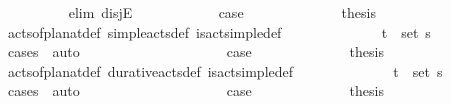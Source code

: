 \begin{isabellebody}
\ \ \ \ \ \ \ \ \isamarkupfalse%
\ {\isacharparenleft}{\kern0pt}elim\ disjE{\isacharparenright}{\kern0pt}\isanewline
\ \ \ \ \ \ \ \ \ \ \isamarkupfalse%
\ {\isacharquery}{\kern0pt}case{}\isanewline
\ \ \ \ \ \ \ \ \ \ \isamarkupfalse%
\ \isamarkupfalse%
\ {\isacharquery}{\kern0pt}thesis\isanewline
\ \ \ \ \ \ \ \ \ \ \ \ \isamarkupfalse%
\ acts{\isacharunderscore}{\kern0pt}of{\isacharunderscore}{\kern0pt}plan{\isacharunderscore}{\kern0pt}at{\isacharunderscore}{\kern0pt}def\ simple{\isacharunderscore}{\kern0pt}acts{\isacharunderscore}{\kern0pt}def\ is{\isacharunderscore}{\kern0pt}act{\isacharunderscore}{\kern0pt}simple{\isacharunderscore}{\kern0pt}def\isanewline
\ \ \ \ \ \ \ \ \ \ \ \ \isamarkupfalse%
\ {\isacartoucheopen}{\isacharparenleft}{\kern0pt}t\isactrlsub {\isasympi}{\isacharcomma}{\kern0pt}{\isasympi}{\isacharparenright}{\kern0pt}\ {\isasymin}\ set\ {\isasympi}s{\isacartoucheclose}\ \isamarkupfalse%
\ {\isacharparenleft}{\kern0pt}cases\ {\isasympi}{\isacharparenright}{\kern0pt}\ auto\isanewline
\ \ \ \ \ \ \ \ \isamarkupfalse%
\isanewline
\ \ \ \ \ \ \ \ \ \ \isamarkupfalse%
\ {\isacharquery}{\kern0pt}case{}\isanewline
\ \ \ \ \ \ \ \ \ \ \isamarkupfalse%
\ \isamarkupfalse%
\ {\isacharquery}{\kern0pt}thesis\isanewline
\ \ \ \ \ \ \ \ \ \ \ \ \isamarkupfalse%
\ acts{\isacharunderscore}{\kern0pt}of{\isacharunderscore}{\kern0pt}plan{\isacharunderscore}{\kern0pt}at{\isacharunderscore}{\kern0pt}def\ durative{\isacharunderscore}{\kern0pt}acts{\isacharunderscore}{\kern0pt}def\ is{\isacharunderscore}{\kern0pt}act{\isacharunderscore}{\kern0pt}simple{\isacharunderscore}{\kern0pt}def\isanewline
\ \ \ \ \ \ \ \ \ \ \ \ \isamarkupfalse%
\ {\isacartoucheopen}{\isacharparenleft}{\kern0pt}t\isactrlsub {\isasympi}{\isacharcomma}{\kern0pt}{\isasympi}{\isacharparenright}{\kern0pt}\ {\isasymin}\ set\ {\isasympi}s{\isacartoucheclose}\ \isamarkupfalse%
\ {\isacharparenleft}{\kern0pt}cases\ {\isasympi}{\isacharparenright}{\kern0pt}\ auto\isanewline
\ \ \ \ \ \ \ \ \isamarkupfalse%
\isanewline
\ \ \ \ \ \ \ \ \ \ \isamarkupfalse%
\ {\isacharquery}{\kern0pt}case{}\isanewline
\ \ \ \ \ \ \ \ \ \ \isamarkupfalse%
\ \isamarkupfalse%
\ {\isacharquery}{\kern0pt}thesis\isanewline

\end{isabellebody}
